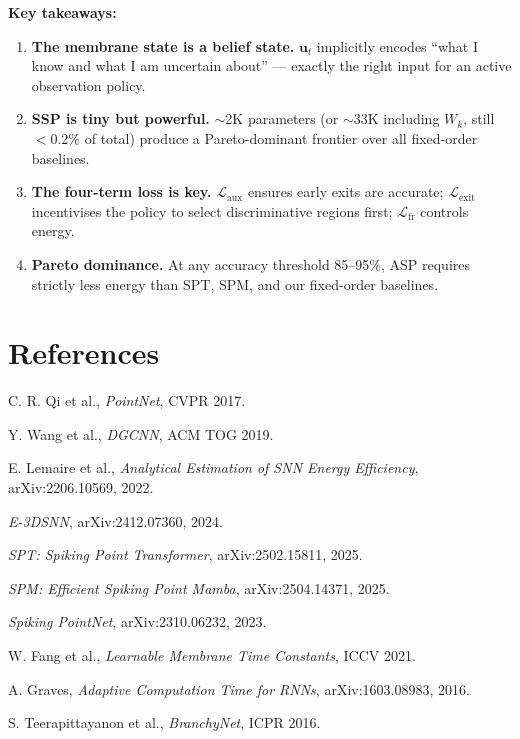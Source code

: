 \documentclass[11pt,a4paper]{article}
\begin{document}
\medskip\noindent
\textbf{Key takeaways:}
\begin{enumerate}
  \item \textbf{The membrane state is a belief state.}  $\mathbf{u}_t$ implicitly
    encodes ``what I know and what I am uncertain about'' --- exactly the right
    input for an active observation policy.
  \item \textbf{SSP is tiny but powerful.}  $\sim$2K parameters (or $\sim$33K
    including $W_k$, still $<0.2\%$ of total) produce a Pareto-dominant frontier
    over all fixed-order baselines.
  \item \textbf{The four-term loss is key.}  $\mathcal{L}_\text{aux}$ ensures
    early exits are accurate; $\mathcal{L}_\text{exit}$ incentivises the policy
    to select discriminative regions first; $\mathcal{L}_\text{fr}$ controls energy.
  \item \textbf{Pareto dominance.}  At any accuracy threshold 85--95\%, ASP
    requires strictly less energy than SPT, SPM, and our fixed-order baselines.
\end{enumerate}

\section*{References}
\begin{enumerate}[label={[\arabic*]}]
  \item C. R. Qi et al., \emph{PointNet}, CVPR 2017.
  \item Y. Wang et al., \emph{DGCNN}, ACM TOG 2019.
  \item E. Lemaire et al., \emph{Analytical Estimation of SNN Energy Efficiency},
        arXiv:2206.10569, 2022.
  \item \emph{E-3DSNN}, arXiv:2412.07360, 2024.
  \item \emph{SPT: Spiking Point Transformer}, arXiv:2502.15811, 2025.
  \item \emph{SPM: Efficient Spiking Point Mamba}, arXiv:2504.14371, 2025.
  \item \emph{Spiking PointNet}, arXiv:2310.06232, 2023.
  \item W. Fang et al., \emph{Learnable Membrane Time Constants}, ICCV 2021.
  \item A. Graves, \emph{Adaptive Computation Time for RNNs}, arXiv:1603.08983, 2016.
  \item S. Teerapittayanon et al., \emph{BranchyNet}, ICPR 2016.
\end{enumerate}
\end{document}
